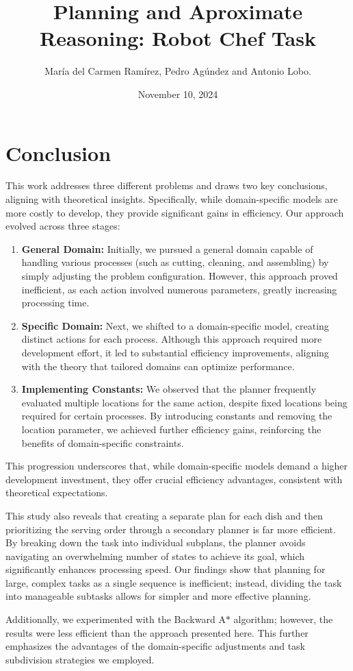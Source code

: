 \documentclass{article}
\title{Planning and Aproximate Reasoning: Robot Chef Task}
\author{
	María del Carmen Ramírez, Pedro Agúndez and Antonio Lobo.
}
\date{November 10, 2024}
\begin{document}
	
	\maketitle

 

 




\section{Conclusion}
This work addresses three different problems and draws two key conclusions, aligning with theoretical insights. Specifically, while domain-specific models are more costly to develop, they provide significant gains in efficiency. Our approach evolved across three stages:

\begin{enumerate}
	\item \textbf{General Domain:} Initially, we pursued a general domain capable of handling various processes (such as cutting, cleaning, and assembling) by simply adjusting the problem configuration. However, this approach proved inefficient, as each action involved numerous parameters, greatly increasing processing time.
	
	\item \textbf{Specific Domain:} Next, we shifted to a domain-specific model, creating distinct actions for each process. Although this approach required more development effort, it led to substantial efficiency improvements, aligning with the theory that tailored domains can optimize performance.
	
	\item \textbf{Implementing Constants:} We observed that the planner frequently evaluated multiple locations for the same action, despite fixed locations being required for certain processes. By introducing constants and removing the location parameter, we achieved further efficiency gains, reinforcing the benefits of domain-specific constraints.
\end{enumerate}

This progression underscores that, while domain-specific models demand a higher development investment, they offer crucial efficiency advantages, consistent with theoretical expectations.

This study also reveals that creating a separate plan for each dish and then prioritizing the serving order through a secondary planner is far more efficient. By breaking down the task into individual subplans, the planner avoids navigating an overwhelming number of states to achieve its goal, which significantly enhances processing speed. Our findings show that planning for large, complex tasks as a single sequence is inefficient; instead, dividing the task into manageable subtasks allows for simpler and more effective planning.

Additionally, we experimented with the Backward A$*$ algorithm; however, the results were less efficient than the approach presented here. This further emphasizes the advantages of the domain-specific adjustments and task subdivision strategies we employed.
\end{document}

